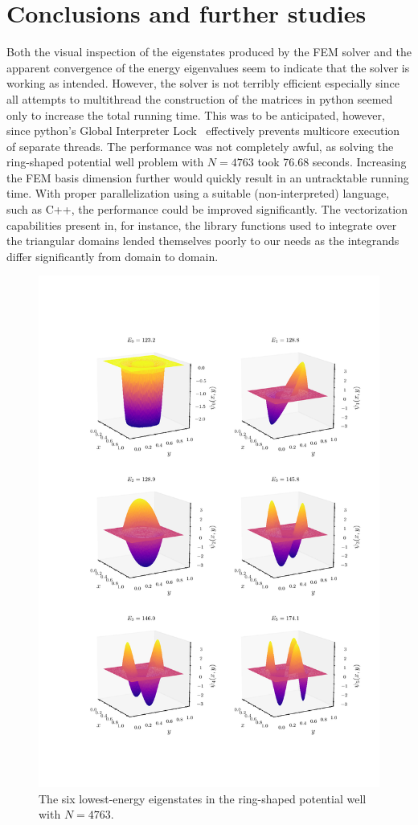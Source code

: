 \documentclass[a4paper,12pt]{article}
\begin{document}
\section{Conclusions and further studies}
Both the visual inspection of the eigenstates produced by the FEM solver and the apparent convergence of the energy eigenvalues seem to indicate that the solver is working as intended. However, the solver is not terribly efficient especially since all attempts to multithread the construction of the matrices in python seemed only to increase the total running time. This was to be anticipated, however, since python's Global Interpreter Lock~\cite{GILdoc} effectively prevents multicore execution of separate threads. The performance was not completely awful, as solving the ring-shaped potential well problem with $N=4763$ took 76.68 seconds. Increasing the FEM basis dimension further would quickly result in an untracktable running time. With proper parallelization using a suitable (non-interpreted) language, such as C++, the performance could be improved significantly. The vectorization capabilities present in, for instance, the library functions used to integrate over the triangular domains lended themselves poorly to our needs as the integrands differ significantly from domain to domain.




\begin{figure}[H]
\centering
\vspace{-5cm}
\includegraphics[width=\textwidth]{../figs/eigenfuncs_circle.pdf}
\caption{The six lowest-energy eigenstates in the ring-shaped potential well with $N=4763$.}
\label{fig: circleEigFuncs}
\end{figure}


\cleardoublepage

\printbibliography
\end{document}
